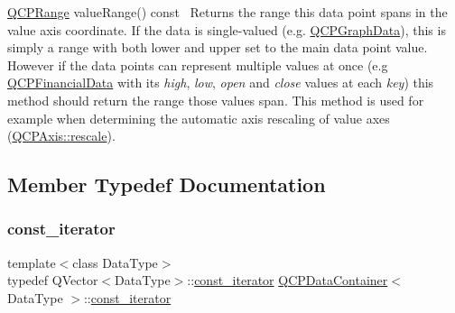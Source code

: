 \begin{DoxyItemize}
\item {\ttfamily \mbox{\hyperlink{class_q_c_p_range}{Q\+C\+P\+Range}} value\+Range() const}~\newline
 Returns the range this data point spans in the value axis coordinate. If the data is single-\/valued (e.\+g. \mbox{\hyperlink{class_q_c_p_graph_data}{Q\+C\+P\+Graph\+Data}}), this is simply a range with both lower and upper set to the main data point value. However if the data points can represent multiple values at once (e.\+g \mbox{\hyperlink{class_q_c_p_financial_data}{Q\+C\+P\+Financial\+Data}} with its {\itshape high}, {\itshape low}, {\itshape open} and {\itshape close} values at each {\itshape key}) this method should return the range those values span. This method is used for example when determining the automatic axis rescaling of value axes (\mbox{\hyperlink{class_q_c_p_axis_a499345f02ebce4b23d8ccec96e58daa9}{Q\+C\+P\+Axis\+::rescale}}). \end{DoxyItemize}


\subsection{Member Typedef Documentation}
\mbox{\label{class_q_c_p_data_container_ae40a91f5cb0bcac61d727427449b7d15}} 
\subsubsection{\texorpdfstring{const\_iterator}{const\_iterator}}
{\footnotesize\ttfamily template$<$class Data\+Type$>$ \\
typedef Q\+Vector$<$Data\+Type$>$\+::\mbox{\hyperlink{class_q_c_p_data_container_ae40a91f5cb0bcac61d727427449b7d15}{const\+\_\+iterator}} \mbox{\hyperlink{class_q_c_p_data_container}{Q\+C\+P\+Data\+Container}}$<$ Data\+Type $>$\+::\mbox{\hyperlink{class_q_c_p_data_container_ae40a91f5cb0bcac61d727427449b7d15}{const\+\_\+iterator}}}

\mbox{\label{class_q_c_p_data_container_a1bb453c3ae37d1ee5268878acb3a9d29}} 
